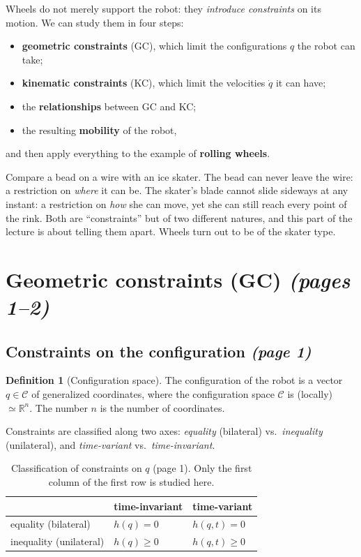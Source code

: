 \documentclass[11pt,a4paper]{article}
\theoremstyle{definition}
\newtheorem{definition}{Definition}[section]
\theoremstyle{plain}
\theoremstyle{remark}
\begin{document}
Wheels do not merely support the robot: they \emph{introduce constraints} on its motion. We can study them in four steps:
\begin{itemize}[nosep]
  \item \textbf{geometric constraints} (GC), which limit the configurations $q$ the robot can take;
  \item \textbf{kinematic constraints} (KC), which limit the velocities $\dot q$ it can have;
  \item the \textbf{relationships} between GC and KC;
  \item the resulting \textbf{mobility} of the robot,
\end{itemize}
and then apply everything to the example of \textbf{rolling wheels}.
 
\begin{intuition}
Compare a bead on a wire with an ice skater. The bead can never leave the wire: a restriction on \emph{where} it can be. The skater's blade cannot slide sideways at any instant: a restriction on \emph{how} she can move, yet she can still reach every point of the rink. Both are ``constraints'' but of two different natures, and this part of the lecture is about telling them apart. Wheels turn out to be of the skater type.
\end{intuition}
 
\section{Geometric constraints (GC) \emph{(pages 1--2)}}
 
\subsection{Constraints on the configuration \emph{(page 1)}}
 
\begin{definition}[Configuration space]
The configuration of the robot is a vector $q\in\mathcal C$ of generalized coordinates, where the configuration space $\mathcal C$ is (locally) $\simeq\mathbb R^n$. The number $n$ is the number of coordinates.
\end{definition}
 
Constraints are classified along two axes: \emph{equality} (bilateral) vs.\ \emph{inequality} (unilateral), and \emph{time-variant} vs.\ \emph{time-invariant}.
 
\begin{table}[H]
\centering\small
\begin{tabular}{@{}lll@{}}
\toprule
 & time-invariant & time-variant\\
\midrule
equality (bilateral) & $h(q)=0$ & $h(q,t)=0$\\
inequality (unilateral) & $h(q)\ge 0$ & $h(q,t)\ge 0$\\
\bottomrule
\end{tabular}
\caption{Classification of constraints on $q$ (page 1). Only the first column of the first row is studied here.}
\end{table}
 
\end{document}
